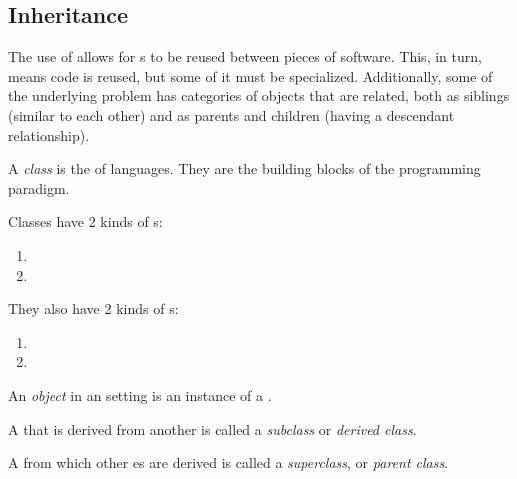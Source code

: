 \subsection{Inheritance}\label{subsec:OOP_Inheritance}
The use of  allows for s to be reused between pieces of software.
This, in turn, means code is reused, but some of it must be specialized.
Additionally, some of the underlying problem has categories of objects that are related, both as siblings (similar to each other) and as parents and children (having a descendant relationship).

\begin{definition}[Class]\label{def:OOP_Class}
  A \emph{class} is the  of  languages.
  They are the building blocks of the programming paradigm.

  Classes have 2 kinds of s:
  \begin{enumerate}[noitemsep]
  \item {}
  \item {}
  \end{enumerate}

  They also have 2 kinds of s:
  \begin{enumerate}[noitemsep]
  \item {}
  \item {}
  \end{enumerate}
\end{definition}

\begin{definition}[Object]\label{def:OOP_Object}
  An \emph{object} in an  setting is an instance of a .
\end{definition}

\begin{definition}[Subclass]\label{def:OOP_Subclass}
  A  that is derived from another  is called a \emph{subclass} or \emph{derived class}.
\end{definition}

\begin{definition}[Superclass]\label{def:OOP_Superclass}
  A  from which other es are derived is called a \emph{superclass}, or \emph{parent class}.
\end{definition}

